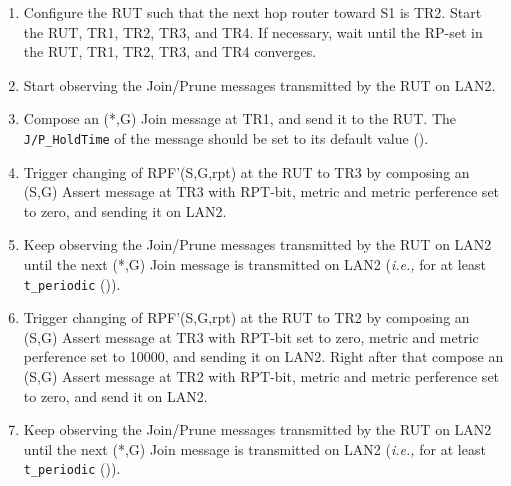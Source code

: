 \documentclass[11pt]{report}
\newcommand{\ie}{\emph{i.e.,}\xspace}
\begin{document}
\begin{enumerate}

  \item Configure the RUT such that the next hop router toward S1 is
  TR2. Start the RUT, TR1, TR2, TR3, and TR4. If necessary, wait until the
  RP-set in the RUT, TR1, TR2, TR3, and TR4 converges.

  \item Start observing the Join/Prune messages transmitted by the RUT on
  LAN2.

  \item Compose an (*,G) Join message at TR1, and send it to the RUT. 
  The \verb=J/P_HoldTime= of the message should be set to its default
  value ({\PimsmJPHoldTime}).

  \item Trigger changing of RPF'(S,G,rpt) at the RUT to TR3 by composing an
  (S,G) Assert message at TR3 with RPT-bit, metric and metric 
  perference set to zero, and sending it on LAN2.

  \item Keep observing the Join/Prune messages transmitted by the
  RUT on LAN2 until the next (*,G) Join message is transmitted on
  LAN2 (\ie for at least \verb=t_periodic= ({\PimsmTPeriodic})).

  \item Trigger changing of RPF'(S,G,rpt) at the RUT to TR2 by composing an
  (S,G) Assert message at TR3 with RPT-bit set to zero, metric and metric 
  perference set to 10000, and sending it on LAN2. Right after that
  compose an (S,G) Assert message at TR2 with RPT-bit, metric and metric 
  perference set to zero, and send it on LAN2.

  \item Keep observing the Join/Prune messages transmitted by the
  RUT on LAN2 until the next (*,G) Join message is transmitted on
  LAN2 (\ie for at least \verb=t_periodic= ({\PimsmTPeriodic})).

\end{enumerate}


\end{document}
